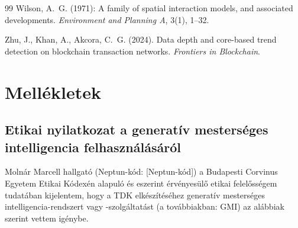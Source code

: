 \documentclass[12pt,a4paper]{article}
\renewcommand{\thesection}{\Roman{section}}
\theoremstyle{definition}
\theoremstyle{remark}
\begin{document}
\begin{thebibliography}{99}
Wilson, A.~G. (1971): A family of spatial interaction models, and associated
developments. \emph{Environment and Planning A}, 3(1), 1--32.

Zhu, J., Khan, A., Akcora, C.~G. (2024). Data depth and core-based trend
detection on blockchain transaction networks. \emph{Frontiers in Blockchain}.

\end{thebibliography}

\clearpage
\appendix
\renewcommand{\thesection}{\Alph{section}}
\section{Mellékletek}

\subsection{Etikai nyilatkozat a generatív mesterséges intelligencia
felhasználásáról}

Molnár Marcell hallgató (Neptun-kód: [Neptun-kód]) a Budapesti Corvinus
Egyetem Etikai Kódexén alapuló és eszerint érvényesülő etikai felelősségem
tudatában kijelentem, hogy a TDK elkészítéséhez generatív mesterséges
intelligencia-rendszert vagy -szolgáltatást (a továbbiakban: GMI) az
alábbiak szerint vettem igénybe.
\end{document}
